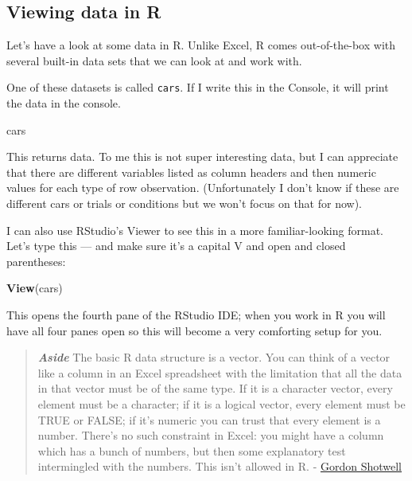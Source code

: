 \documentclass[]{book}
\newenvironment{Shaded}{\begin{snugshade}}{\end{snugshade}}
\newcommand{\KeywordTok}[1]{\textcolor[rgb]{0.13,0.29,0.53}{\textbf{#1}}}
\newcommand{\NormalTok}[1]{#1}
\begin{document}
\hypertarget{viewing-data-in-r}{%
\subsection{Viewing data in R}\label{viewing-data-in-r}}

Let's have a look at some data in R. Unlike Excel, R comes out-of-the-box with several built-in data sets that we can look at and work with.

One of these datasets is called \texttt{cars}. If I write this in the Console, it will print the data in the console.

\begin{Shaded}
\begin{Highlighting}[]
\NormalTok{cars}
\end{Highlighting}
\end{Shaded}

This returns data. To me this is not super interesting data, but I can appreciate that there are different variables listed as column headers and then numeric values for each type of row observation. (Unfortunately I don't know if these are different cars or trials or conditions but we won't focus on that for now).

I can also use RStudio's Viewer to see this in a more familiar-looking format. Let's type this --- and make sure it's a capital V and open and closed parentheses:

\begin{Shaded}
\begin{Highlighting}[]
\KeywordTok{View}\NormalTok{(cars)}
\end{Highlighting}
\end{Shaded}

This opens the fourth pane of the RStudio IDE; when you work in R you will have all four panes open so this will become a very comforting setup for you.

\begin{quote}
\textbf{\emph{Aside}} The basic R data structure is a vector. You can think of a vector like a column in an Excel spreadsheet with the limitation that all the data in that vector must be of the same type. If it is a character vector, every element must be a character; if it is a logical vector, every element must be TRUE or FALSE; if it's numeric you can trust that every element is a number. There's no such constraint in Excel: you might have a column which has a bunch of numbers, but then some explanatory test intermingled with the numbers. This isn't allowed in R. - \href{https://blog.shotwell.ca/posts/r_for_excel_users/}{Gordon Shotwell}
\end{quote}
\end{document}
